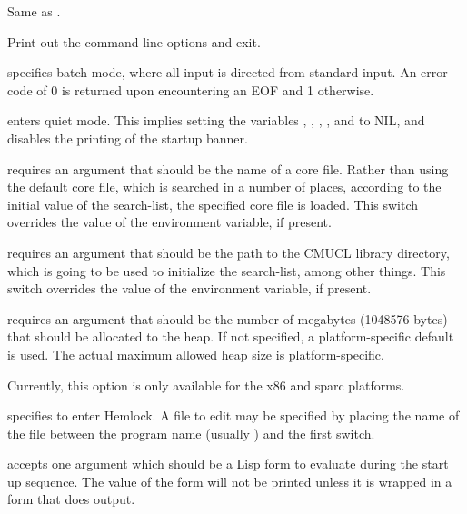 \begin{Lentry}
\item[\code{--help}] Same as .

\item[\code{-help}] Print out the command line options and exit.
  
\item[\code{-batch}] specifies batch mode, where all input is
  directed from standard-input.  An error code of 0 is returned upon
  encountering an EOF and 1 otherwise.

\item[\code{-quiet}] enters quiet mode. This implies setting the
  variables , ,
  , ,
   and  to NIL, and
  disables the printing of the startup banner.

\item[\code{-core}] requires an argument that should be the name of a
  core file.  Rather than using the default core file, which is searched
  in a number of places, according to the initial value of the
   search-list, the specified core file is loaded.  This
  switch overrides the value of the  environment variable,
  if present.
  
\item[\code{-lib}] requires an argument that should be the path to the
  CMUCL library directory, which is going to be used to initialize the
   search-list, among other things.  This switch overrides
  the value of the  environment variable, if present.

\item[\code{-dynamic-space-size}] requires an argument that should be
  the number of megabytes (1048576 bytes) that should be allocated to
  the heap.  If not specified, a platform-specific default is used.
  The actual maximum allowed heap size is platform-specific.

  Currently, this option is only available for the x86 and sparc
  platforms. 

\item[\code{-edit}] specifies to enter Hemlock.  A file to edit may be
  specified by placing the name of the file between the program name
  (usually ) and the first switch.
  
\item[\code{-eval}] accepts one argument which should be a Lisp form
  to evaluate during the start up sequence.  The value of the form
  will not be printed unless it is wrapped in a form that does output.
  

\end{Lentry}
